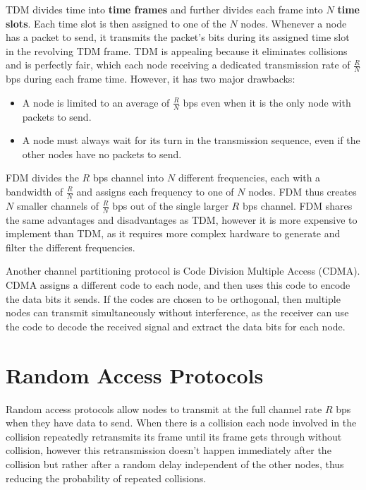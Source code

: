 \documentclass[12pt letter]{report}
\begin{document}
TDM divides time into \textbf{time frames} and further divides each
frame into $N$ \textbf{time slots}. Each time slot is then assigned
to one of the $N$ nodes. Whenever a node has a packet to send, it
transmits the packet's bits during its assigned time slot in the
revolving TDM frame. TDM is appealing because it eliminates
collisions and is perfectly fair, which each node receiving a
dedicated transmission rate of $\frac{R}{N}$ bps during each frame time.
However, it has two major drawbacks:
\begin{itemize}
  \item A node is limited to an average of $\frac{R}{N}$ bps even
    when it is the only node with packets to send.
  \item A node must always wait for its turn in the transmission
    sequence, even if the other nodes have no packets to send.
\end{itemize}

FDM divides the $R$ bps channel into $N$ different frequencies, each
with a bandwidth of $\frac{R}{N}$ and assigns each frequency to one
of $N$ nodes. FDM thus creates $N$ smaller channels of $\frac{R}{N}$
bps out of the single larger $R$ bps channel. FDM shares the same
advantages and disadvantages as TDM, however it is more expensive to
implement than TDM, as it requires more complex hardware to generate
and filter the
different frequencies.

Another channel partitioning protocol is Code Division Multiple
Access (CDMA). CDMA assigns a different code to each node, and then
uses this code to encode the data bits it sends. If the codes are
chosen to be orthogonal, then multiple nodes can transmit
simultaneously without interference, as the receiver can use the code
to decode the received signal and extract the data bits for each node.

\section{Random Access Protocols}

Random access protocols allow nodes to transmit at the full channel
rate $R$ bps when they have data to send. When there is a collision
each node involved in the collision repeatedly retransmits its frame
until its frame gets through without collision, however this
retransmission doesn't happen immediately after the collision but
rather after a random delay independent of the other nodes, thus
reducing the probability of repeated collisions.
\end{document}
